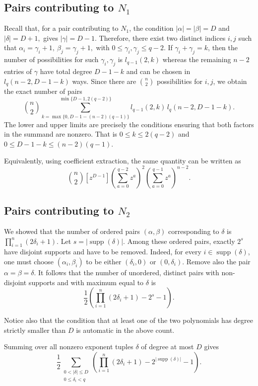 \documentclass[a4paper, 12pt, oneside, openright]{article}
\begin{document}
\subsection{Pairs contributing to $N_1$}

Recall that, for a pair contributing to $N_1$, the condition $|\alpha|=|\beta|=D$ and $|\delta|=D+1,$ gives $|\gamma|=D-1.$
Therefore, there exist two distinct indices $i,j$ such that $\alpha_i=\gamma_i+1,\ \beta_j=\gamma_j+1,$ with $0\le \gamma_i,\gamma_j\le q-2$.
If $\gamma_i+\gamma_j=k$, then the number of possibilities for  such $\gamma_i,\gamma_j$ is $l_{q-1}(2,k)$
whereas the remaining $n-2$ entries of $\gamma$ have total degree $D-1-k$ and can be chosen in $l_q(n-2,D-1-k)$ ways. Since there are $\binom{n}{2}$ possibilities for $i,j$, we obtain the exact number of pairs
\[
\binom{n}{2}
\sum_{k=
\max\{0,D-1-(n-2)(q-1)\}}^{
\min\{D-1,2(q-2)\}}
l_{q-1}(2,k)\,
l_q(n-2,D-1-k).
\]
The lower and upper limits are precisely the conditions ensuring that both factors in the summand are nonzero. That is $0 \le k \le 2(q-2) $ and $0 \le D-1-k \le (n-2)(q-1)$.

Equivalently, using coefficient extraction, the same quantity can be written as
\[
\binom n2
[z^{D-1}]
\left(\sum_{a=0}^{q-2}z^a\right)^2
\left(\sum_{a=0}^{q-1}z^a\right)^{n-2}.
\]

\subsection{Pairs contributing to $N_2$}

We showed that the number of ordered pairs $(\alpha,\beta)$ corresponding to $\delta$ is $\prod_{i=1}^{n}(2\delta_i+1).$
Let $s=|\operatorname{supp}(\delta)|.$
Among these ordered pairs, exactly $2^s$ have disjoint supports and have to be removed.
Indeed, for every $i\in\operatorname{supp}(\delta)$, one must choose $(\alpha_i,\beta_i)$ to be either  $ (\delta_i,0)$ or $(0,\delta_i).$
Remove also the pair $\alpha=\beta=\delta.$
It follows that the number of unordered, distinct pairs with non-disjoint supports and with maximum equal to $\delta$ is
\[
\frac{1}{2}
\left(
\prod_{i=1}^{n}(2\delta_i+1)-2^s-1
\right).
\]

Notice also that the condition that at least one of the two polynomials has degree strictly smaller than $D$ is automatic in the above count.

Summing over all nonzero exponent tuples $\delta$ of degree at most $D$ gives
\[
\frac{1}{2}
\sum_{\substack{
0<|\delta|\le D\\
0\le \delta_i<q
}}
\left(
\prod_{i=1}^{n}
(2\delta_i+1)-2^{|\operatorname{supp}(\delta)|}-1
\right).
\]
\end{document}

